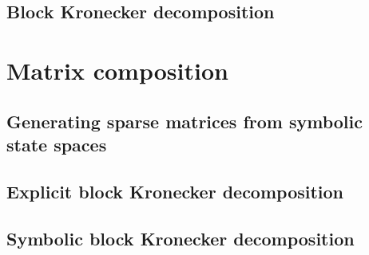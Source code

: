 \subsection{Block Kronecker decomposition}

\section{Matrix composition}

\subsection{Generating sparse matrices from symbolic state spaces}

\subsection{Explicit block Kronecker decomposition}

\subsection{Symbolic block Kronecker decomposition}
